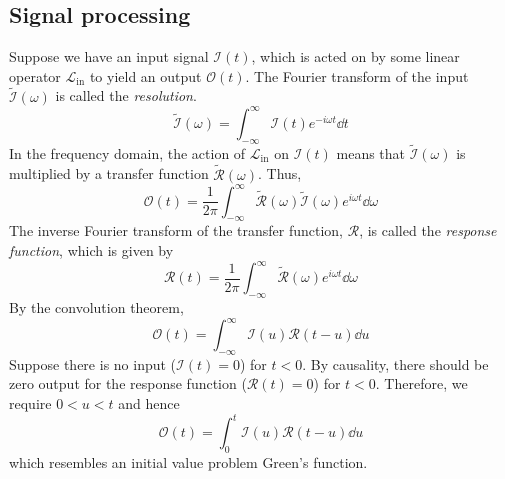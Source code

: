 \subsection{Signal processing}
Suppose we have an input signal \( \mathcal I(t) \), which is acted on by some linear operator \( \mathcal L_{\text{in}} \) to yield an output \( \mathcal O(t) \).
The Fourier transform of the input \( \widetilde{\mathcal I}(\omega) \) is called the \textit{resolution}.
\[
	\widetilde{\mathcal I}(\omega) = \int_{-\infty}^\infty \mathcal I(t) e^{-i\omega t} \dd{t}
\]
In the frequency domain, the action of \( \mathcal L_{\text{in}} \) on \( \mathcal I(t) \) means that \( \widetilde{\mathcal I}(\omega) \) is multiplied by a transfer function \( \widetilde{\mathcal R}(\omega) \).
Thus,
\[
	\mathcal O(t) = \frac{1}{2\pi} \int_{-\infty}^\infty \widetilde{\mathcal R}(\omega) \widetilde{\mathcal I}(\omega) e^{i\omega t} \dd{\omega}
\]
The inverse Fourier transform of the transfer function, \( \mathcal R \), is called the \textit{response function}, which is given by
\[
	\mathcal R(t) = \frac{1}{2\pi} \int_{-\infty}^\infty \widetilde{\mathcal R}(\omega) e^{i \omega t}\dd{\omega}
\]
By the convolution theorem,
\[
	\mathcal O(t) = \int_{-\infty}^\infty \mathcal I(u) \mathcal R(t-u) \dd{u}
\]
Suppose there is no input (\( \mathcal I(t) = 0 \)) for \( t < 0 \).
By causality, there should be zero output for the response function (\( \mathcal R(t) = 0 \)) for \( t < 0 \).
Therefore, we require \( 0 < u < t \) and hence
\[
	\mathcal O(t) = \int_0^t \mathcal I(u) \mathcal R(t-u) \dd{u}
\]
which resembles an initial value problem Green's function.

